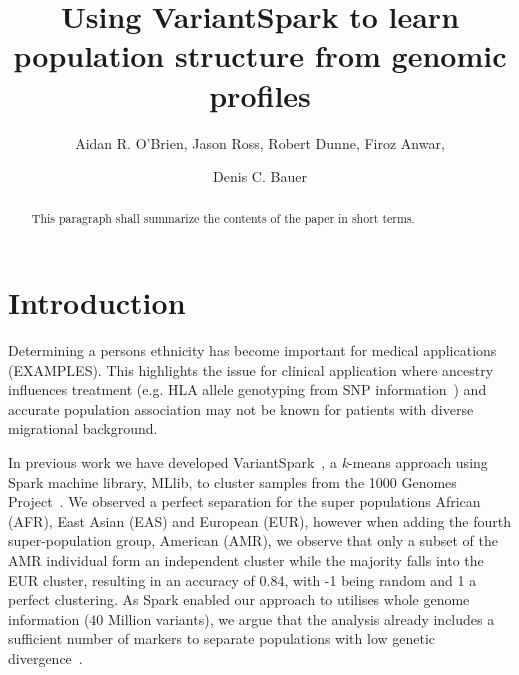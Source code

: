 \documentclass{llncs}
\newcommand{\variantSpark}{{\sc VariantSpark}}
\newcommand{\kMeans}{\textit{k}-means}
\begin{document}
\setcounter{save}{\value{section}}
{\def\addtocontents#1#2{}%
\def\addcontentsline#1#2#3{}%
\def\markboth#1#2{}%
%
\title{Using VariantSpark to learn population structure from genomic profiles}

\author{Aidan R. O'Brien, Jason Ross, Robert Dunne, Firoz Anwar, \and Denis C. Bauer}


\maketitle
%
\begin{abstract}
This paragraph shall summarize the contents of the paper
in short terms.
\end{abstract}
%
\section{Introduction}
%

Determining a persons ethnicity has become important for medical applications (EXAMPLES). This highlights the issue for clinical application where ancestry influences treatment (e.g. HLA allele genotyping from SNP information~\cite{Zheng2014}) and accurate population association may not be known for patients with diverse migrational background.


In previous work we have developed \variantSpark~\cite{OBrien}, a \kMeans{} approach using {\sc Spark} machine library, {\sc MLlib}, to cluster samples from the 1000 Genomes Project~\cite{1KG2012}.
We observed a perfect separation for the super populations African (AFR), East Asian (EAS) and European (EUR), however when adding the fourth super-population group, American (AMR), we observe that only a subset of the AMR individual form an independent cluster while the majority falls into the EUR cluster, resulting in an accuracy of 0.84, with -1 being random and 1 a perfect clustering.
As Spark enabled our approach to utilises whole genome information (40 Million variants), we argue that the analysis already includes a sufficient number of markers to separate populations with low genetic divergence~\cite{Patterson2006}. 

}
\end{document}
